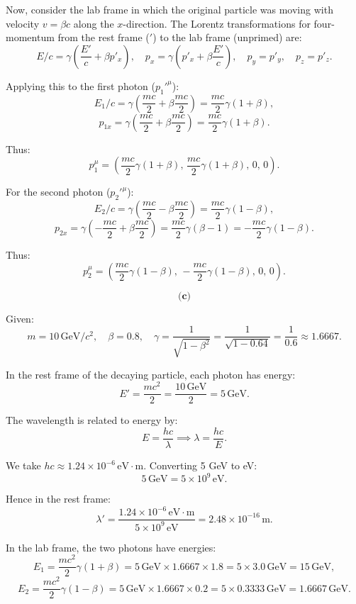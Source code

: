 \documentclass{article}
\begin{document}
Now, consider the lab frame in which the original particle was moving with velocity \(v = \beta c\) along the \(x\)-direction. The Lorentz transformations for four-momentum from the rest frame (\('\)) to the lab frame (unprimed) are:
\[
E/c = \gamma\left(\frac{E'}{c} + \beta p'_x\right), \quad p_x = \gamma(p'_x + \beta \frac{E'}{c}), \quad p_y = p'_y, \quad p_z = p'_z.
\]

Applying this to the first photon (\(p_1'^\mu\)):
\[
E_1/c = \gamma\left(\frac{m c}{2} + \beta \frac{m c}{2}\right) = \frac{m c}{2} \gamma (1+\beta),
\]
\[
p_{1x} = \gamma\left(\frac{m c}{2} + \beta \frac{m c}{2}\right) = \frac{m c}{2}\gamma(1+\beta).
\]

Thus:
\[
p_1^\mu = \left(\frac{m c}{2}\gamma(1+\beta),\, \frac{m c}{2}\gamma(1+\beta),\, 0,\, 0\right).
\]

For the second photon (\(p_2'^\mu\)):
\[
E_2/c = \gamma\left(\frac{m c}{2} - \beta \frac{m c}{2}\right) = \frac{m c}{2} \gamma(1-\beta),
\]
\[
p_{2x} = \gamma\left(-\frac{m c}{2} + \beta \frac{m c}{2}\right) = \frac{m c}{2}\gamma(\beta - 1) = -\frac{m c}{2}\gamma(1-\beta).
\]

Thus:
\[
p_2^\mu = \left(\frac{m c}{2}\gamma(1-\beta),\, -\frac{m c}{2}\gamma(1-\beta),\, 0,\, 0\right).
\]

\[
\textbf{(c)}
\]

Given:
\[
m = 10\,\text{GeV}/c^2, \quad \beta = 0.8, \quad \gamma = \frac{1}{\sqrt{1-\beta^2}} = \frac{1}{\sqrt{1-0.64}} = \frac{1}{0.6} \approx 1.6667.
\]

In the rest frame of the decaying particle, each photon has energy:
\[
E' = \frac{m c^2}{2} = \frac{10\,\text{GeV}}{2} = 5\,\text{GeV}.
\]

The wavelength is related to energy by:
\[
E = \frac{h c}{\lambda} \implies \lambda = \frac{h c}{E}.
\]

We take \(h c \approx 1.24 \times 10^{-6}\,\text{eV}\cdot\text{m}\). Converting 5 GeV to eV:
\[
5\,\text{GeV} = 5 \times 10^9\,\text{eV}.
\]

Hence in the rest frame:
\[
\lambda' = \frac{1.24 \times 10^{-6}\,\text{eV}\cdot\text{m}}{5 \times 10^9\,\text{eV}} = 2.48 \times 10^{-16}\,\text{m}.
\]

In the lab frame, the two photons have energies:
\[
E_1 = \frac{m c^2}{2}\gamma(1+\beta) = 5\,\text{GeV} \times 1.6667 \times 1.8 = 5 \times 3.0\,\text{GeV} = 15\,\text{GeV},
\]
\[
E_2 = \frac{m c^2}{2}\gamma(1-\beta) = 5\,\text{GeV} \times 1.6667 \times 0.2 = 5 \times 0.3333\,\text{GeV} = 1.6667\,\text{GeV}.
\]
\end{document}
